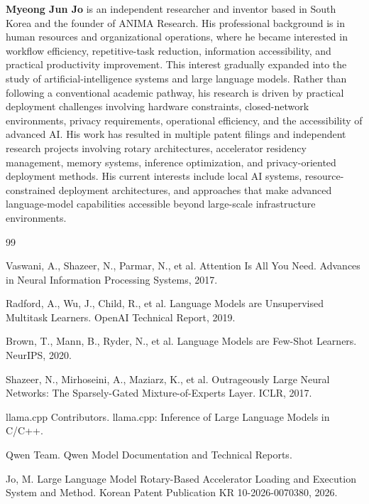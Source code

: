 \documentclass[11pt]{article}
\begin{document}
\textbf{Myeong Jun Jo} is an independent researcher and inventor based in South Korea and the founder of ANIMA Research. His professional background is in human resources and organizational operations, where he became interested in workflow efficiency, repetitive-task reduction, information accessibility, and practical productivity improvement. This interest gradually expanded into the study of artificial-intelligence systems and large language models. Rather than following a conventional academic pathway, his research is driven by practical deployment challenges involving hardware constraints, closed-network environments, privacy requirements, operational efficiency, and the accessibility of advanced AI. His work has resulted in multiple patent filings and independent research projects involving rotary architectures, accelerator residency management, memory systems, inference optimization, and privacy-oriented deployment methods. His current interests include local AI systems, resource-constrained deployment architectures, and approaches that make advanced language-model capabilities accessible beyond large-scale infrastructure environments.

\begin{thebibliography}{99}

Vaswani, A., Shazeer, N., Parmar, N., et al.
Attention Is All You Need.
Advances in Neural Information Processing Systems, 2017.

Radford, A., Wu, J., Child, R., et al.
Language Models are Unsupervised Multitask Learners.
OpenAI Technical Report, 2019.

Brown, T., Mann, B., Ryder, N., et al.
Language Models are Few-Shot Learners.
NeurIPS, 2020.

Shazeer, N., Mirhoseini, A., Maziarz, K., et al.
Outrageously Large Neural Networks: The Sparsely-Gated Mixture-of-Experts Layer.
ICLR, 2017.

llama.cpp Contributors.
llama.cpp: Inference of Large Language Models in C/C++.

Qwen Team.
Qwen Model Documentation and Technical Reports.

Jo, M.
Large Language Model Rotary-Based Accelerator Loading and Execution System and Method.
Korean Patent Publication KR 10-2026-0070380, 2026.

\end{thebibliography}
\end{document}
